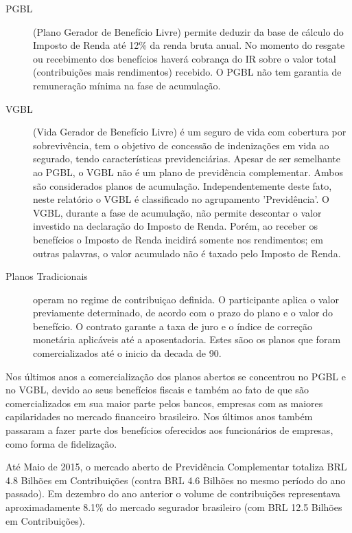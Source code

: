 \documentclass[../../relatorio.tex]{subfiles}
\begin{document}
\begin{description}
  \item[PGBL] (Plano Gerador de Benefício Livre) permite deduzir da base de cálculo do Imposto de Renda até 12\% da renda bruta anual. No momento do resgate ou recebimento dos benefícios haverá cobrança do IR sobre o valor total (contribuições mais rendimentos) recebido. O PGBL não tem garantia de remuneração mínima na fase de acumulação.

  \item[VGBL] (Vida Gerador de Benefício Livre) é um seguro de vida com cobertura por sobrevivência, tem o objetivo de concessão de indenizações em vida ao segurado, tendo características previdenciárias. Apesar de ser semelhante ao PGBL, o VGBL não é um plano de previdência complementar. Ambos são considerados planos de acumulação. Independentemente deste fato, neste relatório o VGBL é classificado no agrupamento 'Previdência'. O VGBL, durante a fase de acumulação, não permite descontar o valor investido na declaração do Imposto de Renda. Porém, ao receber os benefícios o Imposto de Renda incidirá somente nos rendimentos; em outras palavras, o valor acumulado não é taxado pelo Imposto de Renda.

  \item[Planos Tradicionais] operam no regime de contribuiçao definida. O participante aplica o valor previamente determinado, de acordo com o prazo do plano e o valor do benefício. O contrato garante a taxa de juro e o índice de correção monetária aplicáveis até a aposentadoria. Estes sãoo os planos que foram comercializados até o inicio da decada de 90.

\end{description}

Nos últimos anos a comercialização dos planos abertos se concentrou no PGBL e no VGBL, devido ao seus benefícios fiscais e também ao fato de que são comercializados em sua maior parte pelos bancos, empresas com as maiores capilaridades no mercado financeiro brasileiro. Nos últimos anos também passaram a fazer parte dos benefícios oferecidos aos funcionários de empresas, como forma de fidelização.

\pagebreak

Até Maio de 2015, o mercado aberto de Previdência Complementar totaliza BRL 4.8 Bilhões em Contribuições (contra BRL 4.6 Bilhões no mesmo período do ano passado). Em dezembro do ano anterior o volume de contribuições representava aproximadamente 8.1\% do mercado segurador brasileiro (com BRL 12.5 Bilhões em Contribuições).
\end{document}
